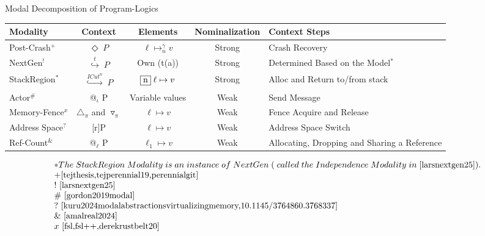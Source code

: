 \documentclass[aspectratio=169,xcolor=dvipsnames]{beamer}
\begin{document}
\begin{frame}{Modal Decomposition of Program-Logics}\scriptsize
\begin{tabular}{@{}lcccp{4cm}@{}}
  \toprule
{ Modality}& { Context} & { Elements}  &  { Nominalization} & { Context Steps} \\ \midrule
 Post-Crash$^{+}$ &  $\Diamond \; P $  &  $  \ell \mapsto_{n}^{\overline{\gamma}} v $ &  Strong &   Crash Recovery    \\ 
 NextGen$^{!}$ &   $\overset{t}{\hookrightarrow} \; P$  &  Own (t(a))  &  Strong &  Determined Based on the Model$^{*}$   \\
 StackRegion$^{*}$  &  $\overset{ICut^{n}}{\hookrightarrow} \; P$      &  $\fbox{n} \; \ell \mapsto v$                                 &  Strong &  Alloc and Return to/from stack\\
 Actor$^{\#}$ & @$_{\iota}$ P    &  Variable values &  Weak &  Send Message \\
 Memory-Fence$^{x}$ &  $\triangle_{\pi}$ and $\triangledown_{\pi}$      &  $\ell \mapsto v$                                 &  Weak &  Fence Acquire and Release  \\
 Address Space$^{?}$ &  [r]P     &   $\ell \mapsto v$ &  Weak                         &  Address Space Switch  \\ 
 Ref-Count$^{\&}$& @$_{\ell}$ P    &  $\ell_1 \mapsto v$ &  Weak  &  Allocating, Dropping and Sharing a Reference \\ \bottomrule
\end{tabular}
\[
\begin{array}{l}
{*The \; StackRegion\; Modality \;is\; an\; instance\; of \; NextGen \; (\;called\; the\; Independence\; Modality\; in\; \cite{larsnextgen25})}. \\
{+ \cite{tejthesis,tejperennial19,perennialgit}}\\
{! ~\cite{larsnextgen25}} \\
{\# ~\cite{gordon2019modal}} \\
{? ~\cite{kuru2024modalabstractionsvirtualizingmemory,10.1145/3764860.3768337}}\\
{\& ~\cite{amalreal2024}} \\
{x ~\cite{fsl,fsl++,derekrustbelt20}}
\end{array}\]
\end{frame}
\end{document}
